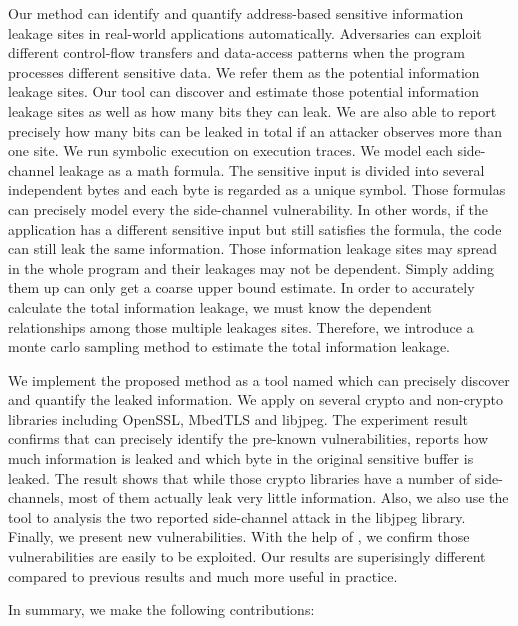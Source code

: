 Our method can identify and quantify address-based
sensitive information leakage sites in real-world applications automatically. 
Adversaries can exploit different control-flow transfers and data-access patterns when 
the program processes different sensitive data. We refer them as the potential information
leakage sites. Our tool can discover and estimate those potential information leakage sites 
as well as how many bits they can leak. We are also able to report precisely how many bits
can be leaked in total if an attacker observes more than one site.
We run symbolic execution on execution traces. We model each side-channel leakage as a math formula. 
The sensitive input is divided into several independent bytes and each byte is regarded as 
a unique symbol. Those formulas can precisely model every the side-channel vulnerability. 
In other words, if the application has a different sensitive input but still satisfies the formula, 
the code can still leak the same information.  
Those information leakage sites may spread in the whole program 
and their leakages may not be dependent. Simply adding them up can only get a coarse upper bound 
estimate. In order to accurately calculate the total information leakage, we must know the 
dependent relationships among those multiple leakages sites. Therefore, we introduce a 
monte carlo sampling method to estimate the total information leakage.

We implement the proposed method as a tool named \tool{} which can precisely discover and quantify the leaked information. 
We apply \tool{} on several crypto and non-crypto libraries including OpenSSL,
MbedTLS and libjpeg. The experiment result confirms that \tool{} can precisely identify the pre-known vulnerabilities,
reports how much information is leaked and which byte in the original sensitive buffer is leaked. 
The result shows that while those crypto libraries have a number of side-channels, most of them actually
leak very little information. Also, we also use the tool to analysis the two reported side-channel attack 
in the libjpeg library. Finally, we present new vulnerabilities. With the help of \tool{}, we confirm those
vulnerabilities are easily to be exploited. Our results are superisingly different compared to previous results
and much more useful in practice.

In summary, we make the following contributions:

